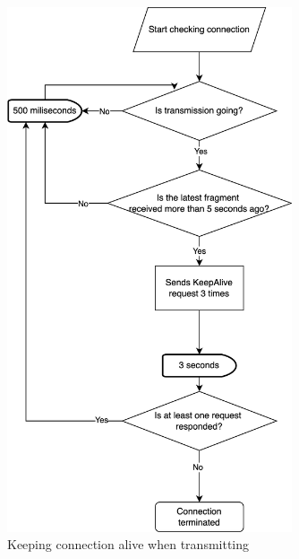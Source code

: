 \documentclass{article}
\begin{document}
\begin{figure}[!h]
    \centering
    \includegraphics[width=0.75\textwidth]{images/trkeepalive.png}
    \caption{Keeping connection alive when transmitting}
    \label{fig:mesh2}
\end{figure}
\end{document}
